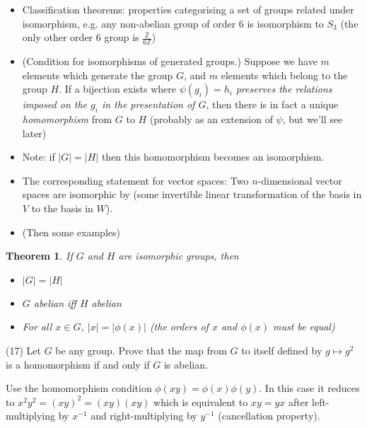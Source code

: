 \documentclass[1    0pt, answers]{exam} \renewcommand{\baselinestretch}{1.05}
\theoremstyle{plain}
\newtheorem{theorem}{Theorem}
\theoremstyle{definition}
\begin{document}
\begin{questions}
\begin{itemize}
\item Classification theorems: properties categorising a set of groups related under isomorphism, e.g. any non-abelian group of order 6 is isomorphism to $S_3$ (the only other order 6 group is $\frac{\mathbb{Z}}{6 \mathbb{Z}}$) %
\item (Condition for isomorphisms of generated groups.) Suppose we have $m$ elements which generate the group $G$, and $m$ elements which belong to the group $H$. If a bijection exists where $\psi(g_i) = h_i$ \emph{preserves the relations imposed on the $g_i$ in the presentation of $G$}, then there is in fact a unique \emph{homomorphism} from $G$ to $H$ (probably as an extension of $\psi$, but we'll see later)
\item Note: if $|G| = |H|$ then this homomorphism becomes an isomorphism.
\item The corresponding statement for vector spaces: Two $n$-dimensional vector spaces are isomorphic by (some invertible linear transformation of the basis in $V$ to the basis in $W$).
\item (Then some examples)
\end{itemize}

\begin{theorem}
If $G$ and $H$ are isomorphic groups, then
\begin{itemize}
\item $|G| = |H|$
\item $G$ abelian iff $H$ abelian
\item For all $x \in G$, $|x| = |\phi(x)|$ (the orders of $x$ and $\phi(x)$ must be equal)
\end{itemize}
\end{theorem}

\question (17) Let $G$ be any group. Prove that the map from $G$ to itself defined by $g \mapsto g^2$ is a homomorphism if and only if $G$ is abelian.

\begin{solution}
Use the homomorphism condition $\phi(xy) = \phi(x)\phi(y)$. In this case it reduces to $x^2 y^2 = (xy)^2 = (xy)(xy)$ which is equivalent to $xy = yx$ after left-multiplying by $x^{-1}$ and right-multiplying by $y^{-1}$ (cancellation property).
\end{solution}




\end{questions}
\end{document}
